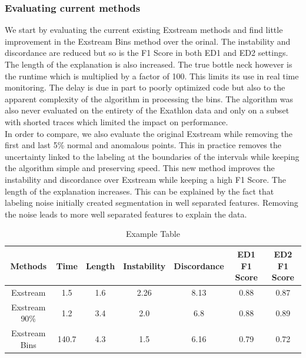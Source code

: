 \documentclass[oneside, a4paper, onecolumn, 11pt]{article}
\begin{document}
\subsubsection{Evaluating current methods}
We start by evaluating the current existing Exstream methods and find little improvement in the Exstream Bins method over the orinal. The instability and discordance are reduced but so is the F1 Score in both ED1 and ED2 settings. The length of the explanation is also increased. The true bottle neck however is the runtime which is multiplied by a factor of 100. This limits its use in real time monitoring. The delay is due in part to poorly optimized code but also to the apparent complexity of the algorithm in processing the bins. The algorithm was also never evaluated on the entirety of the Exathlon data and only on a subset with shorted traces which limited the impact on performance.\\ 
In order to compare, we also evaluate the original Exstream while removing the first and last 5\% normal and anomalous points. This in practice removes the uncertainty linked to the labeling at the boundaries of the intervals while keeping the algorithm simple and preserving speed. This new method improves the instability and discordance over Exstream while keeping a high F1 Score. The length of the explanation increases. This can be explained by the fact that labeling noise initially created segmentation in well separated features. Removing the noise leads to more well separated features to explain the data. \\
\begin{table}[h]
  \centering
  \begin{tabular}{|c|c|c|c|c|c|c|}
      \hline
      Methods & Time & Length & Instability & Discordance & ED1 F1 Score & ED2 F1 Score\\ 
      \hline
      Exstream  & 1.5  & 1.6  & 2.26  & 8.13 & 0.88 & 0.87  \\ 
      Exstream 90\%  & 1.2  & 3.4  & 2.0  & 6.8 & 0.88 & 0.89\\ 
      Exstream Bins  & 140.7  & 4.3  & 1.5  & 6.16 & 0.79 & 0.72 \\ 
      \hline
  \end{tabular}
  \caption{Example Table}
  \label{tab:example}
\end{table}
\end{document}
